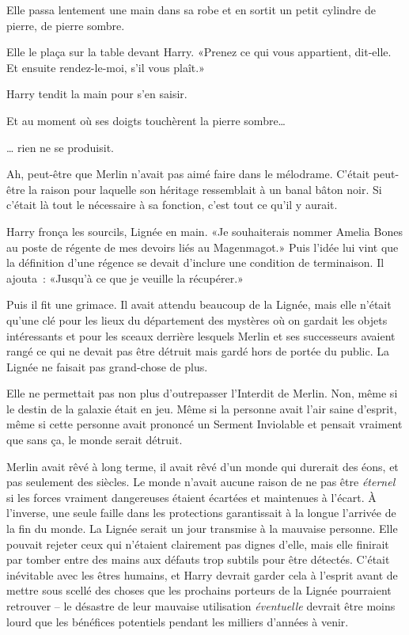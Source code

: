 Elle passa lentement une main dans sa robe et en sortit un petit cylindre de pierre, de pierre sombre.

Elle le plaça sur la table devant Harry. «Prenez ce qui vous appartient, dit-elle. Et ensuite rendez-le-moi, s'il vous plaît.»

Harry tendit la main pour s'en saisir.

Et au moment où ses doigts touchèrent la pierre sombre…

… rien ne se produisit.

Ah, peut-être que Merlin n'avait pas aimé faire dans le mélodrame. C'était peut-être la raison pour laquelle son héritage ressemblait à un banal bâton noir. Si c'était là tout le nécessaire à sa fonction, c'est tout ce qu'il y aurait.

Harry fronça les sourcils, Lignée en main. «Je souhaiterais nommer Amelia Bones au poste de régente de mes devoirs liés au Magenmagot.» Puis l'idée lui vint que la définition d'une régence se devait d'inclure une condition de terminaison. Il ajouta~: «Jusqu'à ce que je veuille la récupérer.»

Puis il fit une grimace. Il avait attendu beaucoup de la Lignée, mais elle n'était qu'une clé pour les lieux du département des mystères où on gardait les objets intéressants et pour les sceaux derrière lesquels Merlin et ses successeurs avaient rangé ce qui ne devait pas être détruit mais gardé hors de portée du public. La Lignée ne faisait pas grand-chose de plus.

Elle ne permettait pas non plus d'outrepasser l'Interdit de Merlin. Non, même si le destin de la galaxie était en jeu. Même si la personne avait l'air saine d'esprit, même si cette personne avait prononcé un Serment Inviolable et pensait vraiment que sans ça, le monde serait détruit.

Merlin avait rêvé à long terme, il avait rêvé d'un monde qui durerait des éons, et pas seulement des siècles. Le monde n'avait aucune raison de ne pas être \emph{éternel} si les forces vraiment dangereuses étaient écartées et maintenues à l'écart. À l'inverse, une seule faille dans les protections garantissait à la longue l'arrivée de la fin du monde. La Lignée serait un jour transmise à la mauvaise personne. Elle pouvait rejeter ceux qui n'étaient clairement pas dignes d'elle, mais elle finirait par tomber entre des mains aux défauts trop subtils pour être détectés. C'était inévitable avec les êtres humains, et Harry devrait garder cela à l'esprit avant de mettre sous scellé des choses que les prochains porteurs de la Lignée pourraient retrouver -- le désastre de leur mauvaise utilisation \emph{éventuelle} devrait être moins lourd que les bénéfices potentiels pendant les milliers d'années à venir.

